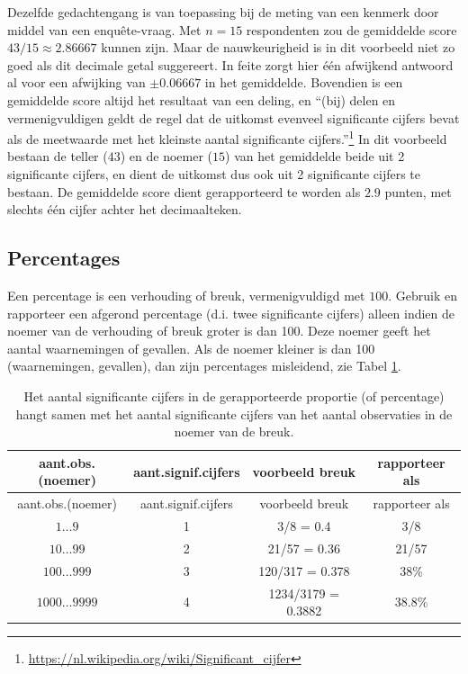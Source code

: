 \documentclass[
]{book}
\begin{document}
Dezelfde gedachtengang is van toepassing bij de meting van een kenmerk
door middel van een enquête-vraag. Met \(n=15\) respondenten zou de
gemiddelde score \(43/15 \approx 2.86667\) kunnen zijn. Maar de
nauwkeurigheid is in dit voorbeeld niet zo goed als dit decimale getal
suggereert. In feite zorgt hier één afwijkend antwoord al voor een
afwijking van \(\pm0.06667\) in het gemiddelde. Bovendien is een
gemiddelde score altijd het resultaat van een deling, en ``(bij) delen
en vermenigvuldigen geldt de regel dat de uitkomst evenveel significante
cijfers bevat als de meetwaarde met het kleinste aantal significante
cijfers.''\footnote{\url{https://nl.wikipedia.org/wiki/Significant_cijfer}} In dit voorbeeld bestaan de teller (\(43\)) en de noemer
(\(15\)) van het gemiddelde beide uit 2 significante cijfers, en dient de
uitkomst dus ook uit 2 significante cijfers te bestaan. De gemiddelde
score dient gerapporteerd te worden als \(2.9\) punten, met slechts één
cijfer achter het decimaalteken.

\hypertarget{percentages}{%
\subsection{Percentages}\label{percentages}}

Een percentage is een verhouding of breuk, vermenigvuldigd met \(100\).
Gebruik en rapporteer een afgerond percentage (d.i. twee significante
cijfers) alleen indien de noemer van de verhouding of breuk groter is
dan 100. Deze noemer geeft het aantal waarnemingen of gevallen. Als de
noemer kleiner is dan 100 (waarnemingen, gevallen), dan zijn percentages
misleidend, zie Tabel \ref{tab:signifcijferspercentage}.

\begin{longtable}[]{@{}cccc@{}}
\caption{\label{tab:signifcijferspercentage} Het aantal significante cijfers in de gerapporteerde proportie (of percentage) hangt samen met het aantal significante cijfers van het aantal observaties in de noemer van de breuk.}\tabularnewline
\toprule
aant.obs.(noemer) & aant.signif.cijfers & voorbeeld breuk & rapporteer als\tabularnewline
\midrule
\endfirsthead
\toprule
aant.obs.(noemer) & aant.signif.cijfers & voorbeeld breuk & rapporteer als\tabularnewline
\midrule
\endhead
\(1\dots9\) & 1 & 3/8 = 0.4 & 3/8\tabularnewline
\(10\dots99\) & 2 & 21/57 = 0.36 & 21/57\tabularnewline
\(100\dots999\) & 3 & 120/317 = 0.378 & 38\%\tabularnewline
\(1000\dots9999\) & 4 & 1234/3179 = 0.3882 & 38.8\%\tabularnewline
\bottomrule
\end{longtable}
\end{document}
